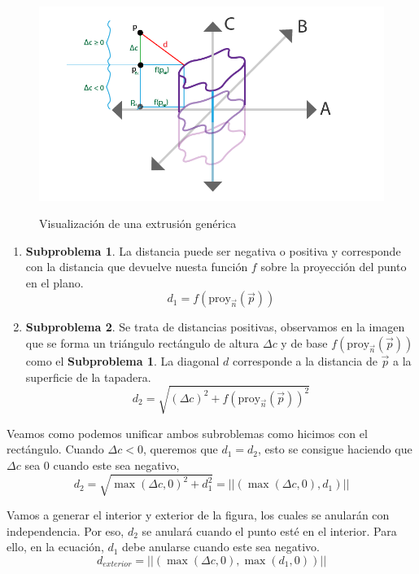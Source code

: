 \begin{figure}[H]
  \centering
  \captionsetup{justification=centering}%
  \includegraphics[width=1.0\textwidth]{secciones/imagenes/sdf/proofs/proof_extrussion.png}\label{fig:proof_extrussion}
  \caption{Visualización de una extrusión genérica}
\end{figure}

\begin{enumerate}
    \item \textbf{Subproblema 1}. La distancia puede ser negativa o positiva y corresponde con la distancia que devuelve nuesta función \(f\) sobre la proyección del punto en el plano.
    \[d_1=f(\text{proy}_{\Vec{n}}(\Vec{p}))\]
    \item \textbf{Subproblema 2}. Se trata de distancias positivas, observamos en la imagen que se forma un triángulo rectángulo de altura \(\Delta c\) y de base \(f(\text{proy}_{\Vec{n}}(\Vec{p}))\) como el \textbf{Subproblema 1}. La diagonal \(d\) corresponde a la distancia de \(\Vec{p}\) a la superficie de la tapadera.
    \[d_2=\sqrt{(\Delta c)^2+f(\text{proy}_{\Vec{n}}(\Vec{p}))^2}\]
\end{enumerate}

Veamos como podemos unificar ambos subroblemas como hicimos con el rectángulo. Cuando \(\Delta c < 0\), queremos que \(d_1=d_2\), esto se consigue haciendo que \(\Delta c\) sea 0 cuando este sea negativo,
\[d_2=\sqrt{\max(\Delta c, 0)^2+d_1^2}=\vert\vert (\max(\Delta c, 0), d_1)\vert\vert\]

Vamos a generar el interior y exterior de la figura, los cuales se anularán con independencia. Por eso, \(d_2\) se anulará cuando el punto esté en el interior. Para ello, en la ecuación, \(d_1\) debe anularse cuando este sea negativo.
\[d_{exterior}=\vert\vert (\max(\Delta c,0), \max(d_1, 0))\vert\vert\]

